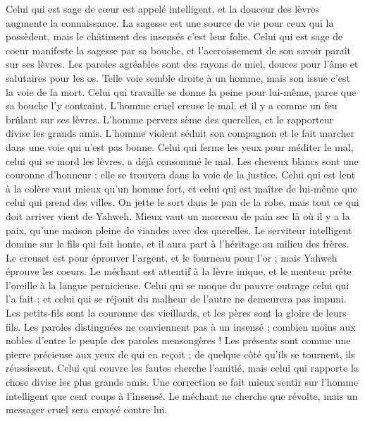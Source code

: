 \begin{multicols}{2}
Celui qui est sage de cœur est appelé intelligent, et la douceur des lèvres augmente la connaissance.
La sagesse est une source de vie pour ceux qui la possèdent, mais le châtiment des insensés c’est leur folie.
Celui qui est sage de coeur manifeste la sagesse par sa bouche, et l’accroissement de son savoir paraît sur ses lèvres.
Les paroles agréables sont des rayons de miel, douces pour l'âme et salutaires pour les os.
Telle voie semble droite à un homme, mais son issue c’est la voie de la mort.
Celui qui travaille se donne la peine pour lui-même, parce que sa bouche l’y contraint.
L’homme cruel creuse le mal, et il y a comme un feu brûlant sur ses lèvres.
L'homme pervers sème des querelles, et le rapporteur divise les grands amis.
L'homme violent séduit son compagnon et le fait marcher dans une voie qui n'est pas bonne.
Celui qui ferme les yeux pour méditer le mal, celui qui se mord les lèvres, a déjà consommé le mal.
Les cheveux blancs sont une couronne d'honneur ; elle se trouvera dans la voie de la justice.
Celui qui est lent à la colère vaut mieux qu’un homme fort, et celui qui est maître de lui-même que celui qui prend des villes.
On jette le sort dans le pan de la robe, mais tout ce qui doit arriver vient de Yahweh.
\VerseOne{}Mieux vaut un morceau de pain sec là où il y a la paix, qu'une maison pleine de viandes avec des querelles.
Le serviteur intelligent domine sur le fils qui fait honte, et il aura part à l'héritage au milieu des frères.
Le creuset est pour éprouver l'argent, et le fourneau pour l'or ; mais Yahweh éprouve les coeurs.
Le méchant est attentif à la lèvre inique, et le menteur prête l’oreille à la langue pernicieuse.
Celui qui se moque du pauvre outrage celui qui l’a fait ; et celui qui se réjouit du malheur de l’autre ne demeurera pas impuni.
Les petits-fils sont la couronne des vieillards, et les pères sont la gloire de leurs fils.
Les paroles distinguées ne conviennent pas à un insensé ; combien moins aux nobles d'entre le peuple des paroles mensongères !
Les présents sont comme une pierre précieuse aux yeux de qui en reçoit ; de quelque côté qu'ils se tournent, ils réussissent.
Celui qui couvre les fautes cherche l'amitié, mais celui qui rapporte la chose divise les plus grands amis.
Une correction se fait mieux sentir sur l'homme intelligent que cent coups à l’insensé.
Le méchant ne cherche que révolte, mais un messager cruel sera envoyé contre lui.

\end{multicols}
